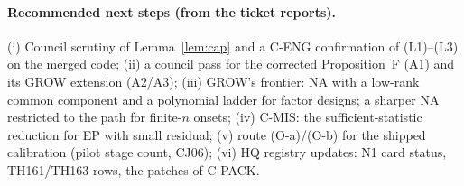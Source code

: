 \paragraph{Recommended next steps (from the ticket reports).} (i) Council scrutiny of Lemma~\ref{lem:cap} and a C-ENG confirmation of (L1)--(L3) on the merged code; (ii) a council pass for the corrected Proposition~F (A1) and its GROW extension (A2/A3); (iii) GROW's frontier: NA with a low-rank common component and a polynomial ladder for factor designs; a sharper NA restricted to the path for finite-$n$ onsets; (iv) C-MIS: the sufficient-statistic reduction for EP with small residual; (v) route (O-a)/(O-b) for the shipped calibration (pilot stage count, CJ06); (vi) HQ registry updates: N1 card status, TH161/TH163 rows, the patches of C-PACK.
